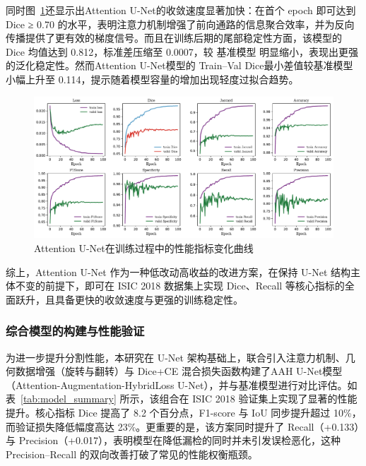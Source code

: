 同时图~\ref{fig:attunet}还显示出Attention U-Net的收敛速度显著加快：在首个 epoch 即可达到 Dice ≥ 0.70 的水平，表明注意力机制增强了前向通路的信息聚合效率，并为反向传播提供了更有效的梯度信号。而且在训练后期的尾部稳定性方面，该模型的 Dice 均值达到 0.812，标准差压缩至 0.0007，较 基准模型 明显缩小，表现出更强的泛化稳定性。然而Attention U-Net模型的 Train–Val Dice最小差值较基准模型小幅上升至 0.114，提示随着模型容量的增加出现轻度过拟合趋势。

\begin{figure}[!htbp]
    \centering
    \includegraphics[width=\textwidth]{fig/attunet_metrics.pdf}
    \caption{Attention U-Net在训练过程中的性能指标变化曲线}
    \label{fig:attunet}
\end{figure}

综上，Attention U-Net 作为一种低改动高收益的改进方案，在保持 U-Net 结构主体不变的前提下，即可在 ISIC 2018 数据集上实现 Dice、Recall 等核心指标的全面跃升，且具备更快的收敛速度与更强的训练稳定性。

\subsubsection{综合模型的构建与性能验证}

为进一步提升分割性能，本研究在 U-Net 架构基础上，联合引入注意力机制、几何数据增强（旋转与翻转）与 Dice+CE 混合损失函数构建了AAH U-Net模型（Attention-Augmentation-HybridLoss U-Net），并与基准模型进行对比评估。如表~\ref{tab:model_summary} 所示，该组合在 ISIC 2018 验证集上实现了显著的性能提升。核心指标 Dice 提高了 8.2 个百分点，F1-score 与 IoU 同步提升超过 10\%，而验证损失降低幅度高达 23\%。更重要的是，该方案同时提升了 Recall（+0.133）与 Precision（+0.017），表明模型在降低漏检的同时并未引发误检恶化，这种 Precision–Recall 的双向改善打破了常见的性能权衡瓶颈。

